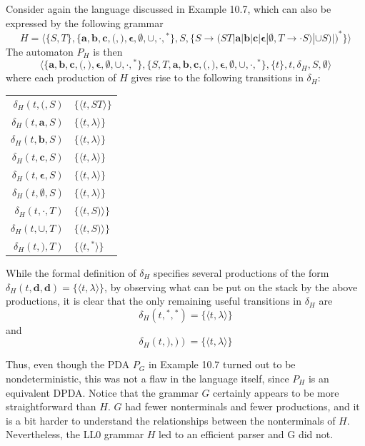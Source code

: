 Consider again the language discussed in Example 10.7, which can also be
expressed by the following grammar
\[ H = \langle\{S,T\},\{\pmb{a},\pmb{b},\pmb{c},\pmb{(},\pmb{)},\pmb{\epsilon},
	\pmb{\emptyset},\pmb{\cup},\pmb{\cdot},\pmb{^*}\},S,\{S\rightarrow\pmb{(}ST|
	\pmb{a}|\pmb{b}|\pmb{c}|\pmb{\epsilon}|\pmb{\emptyset},T\rightarrow
	\pmb{\cdot}S\pmb{)}|\pmb{\cup} S\pmb{)}|\pmb{)^*}\}\rangle \]
The automaton $P_H$ is then
\[ \langle\{\pmb{a},\pmb{b},\pmb{c},\pmb{(},\pmb{)},\pmb{\epsilon},
	\pmb{\emptyset},\pmb{\cup},\pmb{\cdot},\pmb{^*}\},\{S,T,\pmb{a},\pmb{b},
	\pmb{c},\pmb{(},\pmb{)},\pmb{\epsilon},\pmb{\emptyset},\pmb{\cup},
	\pmb{\cdot},\pmb{^*}\},\{t\},t,\delta_H,S,\emptyset\rangle \]
where each production of $H$ gives rise to the following transitions in
$\delta_H$:
\begin{center}\begin{tabular}{r@{ = }l}
$\delta_H(t,\pmb{(},S)$ & $\{\langle t,ST\rangle\}$ \\
$\delta_H(t,\pmb{a},S)$ & $\{\langle t,\lambda\rangle\}$ \\
$\delta_H(t,\pmb{b},S)$ & $\{\langle t,\lambda\rangle\}$ \\
$\delta_H(t,\pmb{c},S)$ & $\{\langle t,\lambda\rangle\}$ \\
$\delta_H(t,\pmb{\epsilon},S)$ & $\{\langle t,\lambda\rangle\}$ \\
$\delta_H(t,\pmb{\emptyset},S)$ & $\{\langle t,\lambda\rangle\}$ \\
$\delta_H(t,\pmb{\cdot},T)$ & $\{\langle t,S\pmb{)}\rangle\}$ \\
$\delta_H(t,\pmb{\cup},T)$ & $\{\langle t,S\pmb{)}\rangle\}$ \\
$\delta_H(t,\pmb{)},T)$ & $\{\langle t,\pmb{^*}\rangle\}$
\end{tabular}\end{center}
While the formal definition of $\delta_H$ specifies several productions of the
form $\delta_H(t,\pmb{d},\pmb{d})=\{\langle t,\lambda\rangle\}$, by observing
what can be put on the stack by the above productions, it is clear that the only
remaining useful transitions in $\delta_H$ are
\[ \delta_H(t,\pmb{^*},\pmb{^*})=\{\langle t,\lambda\rangle\} \]
and
\[ \delta_H(t,\pmb{)},\pmb{)})=\{\langle t,\lambda\rangle\} \]

Thus, even though the PDA $P_G$ in Example 10.7 turned out to be nondeterministic,
this was not a flaw in the language itself, since $P_H$ is an equivalent DPDA.
Notice that the grammar $G$ certainly appears to be more straightforward than
$H$. $G$ had fewer nonterminals and fewer productions, and it is a bit harder to
understand the relationships between the nonterminals of $H$. Nevertheless, the
LL0 grammar $H$ led to an efficient parser and G did not.

